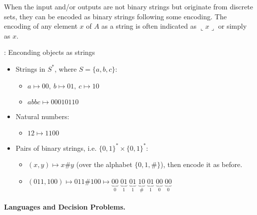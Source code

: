\documentclass{article}
\begin{document}
			When the input and/or outputs are not binary strings but originate from discrete sets, they can be encoded as binary strings following some encoding. The encoding of any element $x$ of $A$ as a string is often indicated as $\llcorner x \lrcorner$ or simply as $x$.
			\vspace{0.1cm}
			\begin{example}{: Enconding objects as strings}
    			\begin{itemize}[leftmargin=*]
        			\item Strings in $S^*$, where $S=\{a,b,c\}$:
            			\begin{itemize}
                			\item $a\mapsto00,\ b\mapsto 01,\ c\mapsto 10$
                			\item $abbc\mapsto 00010110$
            			\end{itemize}
        			\item Natural numbers:
        			\begin{itemize}
        				\item $12\mapsto 1100$	
        			\end{itemize}
        			\item Pairs of binary strings, i.e. $\{0,1\}^* \times \{0,1\}^*$:
        				\begin{itemize}
        					\item $(x,y)\mapsto x\#y$ (over the alphabet $\{0,1,\#\}$), then encode it as before.
        					\item $(011, 100) \mapsto 011\#100 \mapsto \underbrace{00}_{0} \; \underbrace{01}_{1} \; \underbrace{01}_{1} \; \underbrace{10}_{\#} \; \underbrace{01}_{1} \; \underbrace{00}_{0} \; \underbrace{00}_{0}$
        				\end{itemize}
    			\end{itemize}
			\end{example}
			\paragraph{Languages and Decision Problems.}
			\mbox{}
			\vspace{0.1cm}
			
\end{document}
